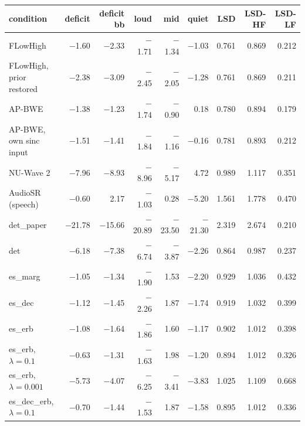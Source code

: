 \begin{tabular}{lrrrrrrrr}
\toprule
condition & deficit & deficit bb & loud & mid & quiet & LSD & LSD-HF & LSD-LF \\
\midrule
FLowHigh & $-$1.60 & $-$2.33 & $-$1.71 & $-$1.34 & $-$1.03 & 0.761 & 0.869 & 0.212 \\
FLowHigh, prior restored & $-$2.38 & $-$3.09 & $-$2.45 & $-$2.05 & $-$1.28 & 0.761 & 0.869 & 0.211 \\
AP-BWE & $-$1.38 & $-$1.23 & $-$1.74 & $-$0.90 & 0.18 & 0.780 & 0.894 & 0.179 \\
AP-BWE, own sinc input & $-$1.51 & $-$1.41 & $-$1.84 & $-$1.16 & $-$0.16 & 0.781 & 0.893 & 0.212 \\
NU-Wave 2 & $-$7.96 & $-$8.93 & $-$8.96 & $-$5.17 & 4.72 & 0.989 & 1.117 & 0.351 \\
AudioSR (speech) & $-$0.60 & 2.17 & $-$1.03 & 0.28 & $-$5.20 & 1.561 & 1.778 & 0.470 \\
det\_paper & $-$21.78 & $-$15.66 & $-$20.89 & $-$23.50 & $-$21.30 & 2.319 & 2.674 & 0.210 \\
det & $-$6.18 & $-$7.38 & $-$6.74 & $-$3.87 & $-$2.26 & 0.864 & 0.987 & 0.237 \\
es\_marg & $-$1.05 & $-$1.34 & $-$1.90 & 1.53 & $-$2.20 & 0.929 & 1.036 & 0.432 \\
es\_dec & $-$1.12 & $-$1.45 & $-$2.26 & 1.87 & $-$1.74 & 0.919 & 1.032 & 0.399 \\
es\_erb & $-$1.08 & $-$1.64 & $-$1.86 & 1.60 & $-$1.17 & 0.902 & 1.012 & 0.398 \\
es\_erb, $\lambda{=}0.1$ & $-$0.63 & $-$1.31 & $-$1.63 & 1.98 & $-$1.20 & 0.894 & 1.012 & 0.326 \\
es\_erb, $\lambda{=}0.001$ & $-$5.73 & $-$4.07 & $-$6.25 & $-$3.41 & $-$3.83 & 1.025 & 1.109 & 0.668 \\
es\_dec\_erb, $\lambda{=}0.1$ & $-$0.70 & $-$1.44 & $-$1.53 & 1.87 & $-$1.58 & 0.895 & 1.012 & 0.336 \\
\bottomrule
\end{tabular}
